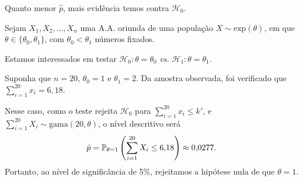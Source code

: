 \begin{note}
Quanto menor $\hat{p}$, mais evidência temos contra $\mathcal{H}_0$.
\end{note}

\begin{example}
Sejam $X_1,X_2,\ldots,X_n$ uma A.A. oriunda de uma população $X\sim\text{exp}(\theta)$, em que $\theta\in\{\theta_0,\theta_1\}$, com $\theta_0<\theta_1$ números fixados.

Estamos interessados em testar $\mathcal{H}_0:\theta=\theta_0$ \emph{vs.} $\mathcal{H}_1:\theta=\theta_1$.

Suponha que $n=20$, $\theta_0=1$ e $\theta_1=2$. Da amostra observada, foi verificado que $\sum_{i=1}^{20}x_i=6{,}18$.

Nesse caso, como o teste rejeita $\mathcal{H}_0$ para $\sum_{i=1}^{20}x_i\leq k'$, e $\sum_{i=1}^{20}X_i\sim\text{gama}(20,\theta)$, o nível descritivo será
\begin{equation}
\hat{p}=\P_{\theta=1}\left(\sum_{i=1}^{20}X_i\leq6{,}18\right)\approx0{,}0277.
\end{equation}
Portanto, ao nível de significância de 5\%, rejeitamos a hipótese nula de que $\theta=1$.
\end{example}
